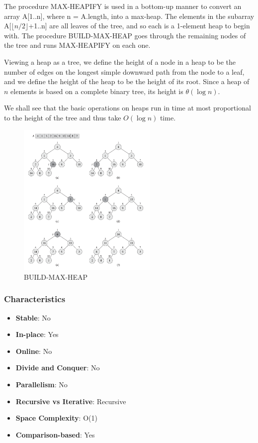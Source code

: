 \begin{observationblock}[Choosing i]
The procedure MAX-HEAPIFY is used in a bottom-up manner to convert an array A[1..n], where n = A.length, into a max-heap. The elements in the subarray A[$\lfloor n/2 \rfloor$+1..n] are all leaves of the tree, and so each is a 1-element heap to begin with. The procedure BUILD-MAX-HEAP goes through the remaining nodes of the tree and runs MAX-HEAPIFY on each one.
\end{observationblock}

Viewing a heap as a tree, we define the height of a node in a heap to be the
number of edges on the longest simple downward path from the node to a leaf, and
we define the height of the heap to be the height of its root. Since a heap of $n$ elements is based on a complete binary tree, its height is $\theta(\log n)$.

We shall see that the basic operations on heaps run in time at most proportional
to the height of the tree and thus take $O(\log n)$ time.

\begin{figure}[H]
    \centering
    \includegraphics[width=0.6\textwidth]{assets/heapsort.png}
    \caption{BUILD-MAX-HEAP \cite{cormen2022introduction}}
\end{figure}

\subsubsection*{Characteristics}

\begin{multicols}{2}
    \begin{itemize}
        \item \textbf{Stable}: No
        \item \textbf{In-place}: Yes
        \item \textbf{Online}: No
        \item \textbf{Divide and Conquer}: No
        \item \textbf{Parallelism}: No
        \item \textbf{Recursive vs Iterative}: Recursive
        \item \textbf{Space Complexity}: O(1)
        \item \textbf{Comparison-based}: Yes
    \end{itemize}
\end{multicols}

